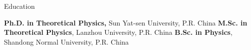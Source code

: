 \begin{rubric}{Education}

\entry*[2017 -- 2020]%
    \textbf{Ph.D. in Theoretical Physics,} Sun Yat-sen University, P.R. China 
%
\entry*[2013 -- 2016]%
    \textbf{M.Sc. in Theoretical Physics}, Lanzhou University, P.R. China %
\entry*[2009 -- 2013]%
    \textbf{B.Sc. in Physics}, Shandong Normal University, P.R. China %
\end{rubric}
